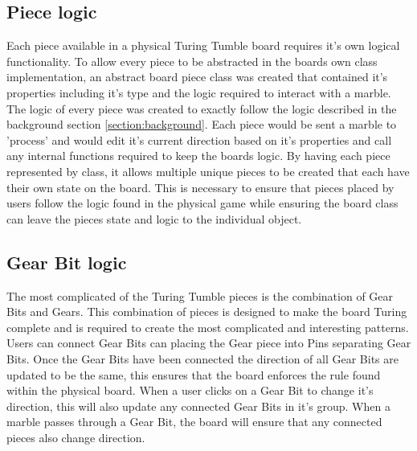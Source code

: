 \documentclass{l4proj}
\begin{document}
\subsection{Piece logic}
Each piece available in a physical Turing Tumble board requires it's own logical functionality. To allow every piece to be abstracted in the boards own class implementation, an abstract board piece class was created that contained it's properties including it's type and the logic required to interact with a marble. The logic of every piece was created to exactly follow the logic described in the background section \ref{section:background}. Each piece would be sent a marble to 'process' and would edit it's current direction based on it's properties and call any internal functions required to keep the boards logic. By having each piece represented by class, it allows multiple unique pieces to be created that each have their own state on the board. This is necessary to ensure that pieces placed by users follow the logic found in the physical game while ensuring the board class can leave the pieces state and logic to the individual object.  


\subsection{Gear Bit logic}
The most complicated of the Turing Tumble pieces is the combination of Gear Bits and Gears. This combination of pieces is designed to make the board Turing complete and is required to create the most complicated and interesting patterns. Users can connect Gear Bits can placing the Gear piece into Pins separating Gear Bits. Once the Gear Bits have been connected the direction of all Gear Bits are updated to be the same, this ensures that the board enforces the rule found within the physical board. When a user clicks on a Gear Bit to change it's direction, this will also update any connected Gear Bits in it's group. When a marble passes through a Gear Bit, the board will ensure that any connected pieces also change direction.
\end{document}

